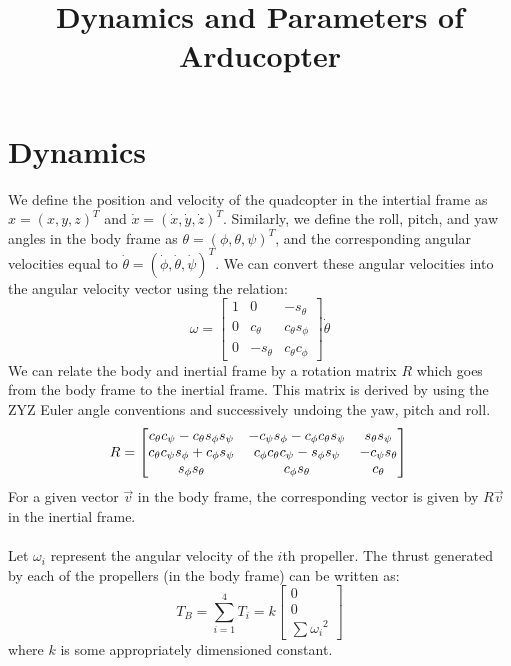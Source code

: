 \documentclass{article}
\begin{document}
\title{Dynamics and Parameters of Arducopter}
\maketitle
\noindent
\section{Dynamics}
We define the position and velocity of the quadcopter in the intertial frame as $x = (x,y,z)^T$ and $\dot{x} = (\dot{x},\dot{y},\dot{z})^T$. Similarly, we define the roll, pitch, and yaw angles in the body frame as $\theta = (\phi,\theta,\psi)^T$, and the corresponding angular velocities equal to $\dot{\theta} = (\dot{\phi},\dot{\theta},\dot{\psi})^T$. We can convert these angular velocities into the angular velocity vector using the relation:
\begin{equation}
\omega = 	\begin{bmatrix}
			1 & 0 & -s_{\theta} \\
			0 & c_{\theta} & c_{\theta}s_{\phi} \\
			0 & -s_{\theta} & c_{\theta}c_{\phi}
			\end{bmatrix}
			\dot{\theta}
\end{equation}			
We can relate the body and inertial frame by a rotation matrix $R$ which goes from the body frame to the inertial frame. This matrix is derived by using the ZYZ Euler angle conventions and successively undoing the yaw, pitch and roll.
\begin{equation}
R =   	\begin{bmatrix} 
		c_{\theta}c_{\psi}-c_{\theta}s_{\phi}s_{\psi} & -c_{\psi}s_{\phi}-c_{\phi}c_{\theta}s_{\psi} & s_{\theta}s_{\psi} 	\\
		c_{\theta}c_{\psi}s_{\phi}+c_{\phi}s_{\psi} & c_{\phi}c_{\theta}c_{\psi}-s_{\phi}s_{\psi} & -c_{\psi}s_{\theta} 	\\
		s_{\phi}s_{\theta} & c_{\phi}s_{\theta} & c_{\theta}
		\end{bmatrix}\\		
\end{equation}
For a given vector $\vec{v}$ in the body frame, the corresponding vector is given by $R\vec{v}$ in the inertial frame.\\\\
Let $\omega_i$ represent the angular velocity of the $i$th propeller.  The thrust generated by each of the propellers (in the body frame) can be written as:
\begin{equation}
\label{thrust}
T_B = \sum\limits_{i=1}^4 T_i = k \begin{bmatrix} 0 \\ 0 \\ \sum\nolimits {\omega_i}^2 \end{bmatrix}
\end{equation}
where $k$ is some appropriately dimensioned constant. 
\end{document}
